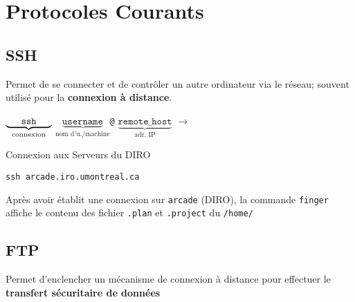 \documentclass[a4paper]{report}
\begin{document}
    \chapter{Protocoles Courants}
    \section{SSH}
    \begin{Protocole}[SSH]
        Permet de se connecter et de contrôler un autre ordinateur via le réseau; 
        souvent utilisé pour la \textbf{connexion à distance}.  
    \end{Protocole}

    \begin{center}
        \( \underbrace{\texttt{\phantom{000}ssh\phantom{000}}}_{\text{connexion}}  \)
        \(\underbrace{\texttt{username}}_{\text{nom d'u./machine}} \)\texttt{@}
        \( \underbrace{\texttt{remote\_host}}_{\text{adr. IP}}  \)
        $\longrightarrow$
        

    \begin{EExample}{Connexion aux Serveurs du DIRO}{}
        \begin{center}
            \texttt{ssh arcade.iro.umontreal.ca}  
        \end{center}
    \end{EExample}

    \begin{note}{}{}
        Après avoir établit une connexion sur \texttt{arcade} (DIRO), la commande 
        \texttt{finger} affiche le contenu des fichier \texttt{.plan} et \texttt{.project} 
        du \texttt{\mytexttilde/home/}  
    \end{note}
    \end{center}            

    \section{FTP}
    \begin{Protocole}[SFPT]
        Permet d'enclencher un mécanisme de connexion à distance pour effectuer 
        le \textbf{transfert sécuritaire de données}      
    \end{Protocole}
\end{document}
